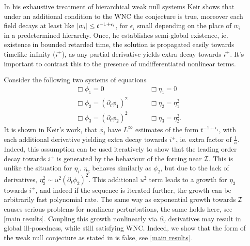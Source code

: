\documentclass[11pt, oneside]{amsart}
\begin{document}
	In his exhaustive treatment of hierarchical weak null systems Keir shows that under an additional condition to the WNC the conjecture is true, moreover each field decays at least like $\left\lvert w_i\right\rvert\leq t^{-1+\epsilon_i}$, for $\epsilon_i$ small depending on the place of $w_i$ in a predetermined hierarchy. Once, he establishes semi-global existence, ie. existence in bounded retarded time, the solution is propagated easily towards timelike infinity ($i^+$), as any partial derivative yields extra decay towards $i^+$. It's important to contrast this to the presence of undifferentiated nonlinear terms.
	
	Consider the following two systems of equations
	\begin{equation*}
		\begin{aligned}
			&\Box\phi_1=0&&&&\Box\eta_1=0\\
			&\Box\phi_2=(\partial_t\phi_1)^2&&&&\Box\eta_2=\eta_1^2\\
			&\Box\phi_3=(\partial_t\phi_2)^2&&&&\Box\eta_3=\eta_2^2.
		\end{aligned}
	\end{equation*}
	It is shown in Keir's work, that $\phi_i$ have $L^\infty$ estimates of the form $t^{-1+\epsilon_i}$, with each additional derivative yielding extra decay towards $i^+$, ie. extra factor of $\frac{1}{u}$. Indeed, this assumption can be used iteratively to show that the leading order decay towards $i^+$ is generated by the behaviour of the forcing near $\mathcal{I}$. This is unlike the situation for $\eta_i$. $\eta_2$ behaves similarly as $\phi_2$, but due to the lack of derivatives, $\eta_2^2\sim u^2 (\partial_t\phi_2)^2$. This additional $u^2$ term leads to a growth for $\eta_3$ towards $i^+$, and indeed if the sequence is iterated further, the growth can be arbitrarily fast polynomial rate. The same way as exponential growth towards $\mathcal{I}$ causes serious problems for nonlinear perturbations, the same holds here, see \cref{main results}. Coupling this growth nonlinearly via $\partial_v$ derivatives may result in global ill-posedness, while still satisfying WNC. Indeed, we show that the form of the weak null conjecture as stated in \cite{deng_global_2018} is false, see \cref{main results}.
	
		
\end{document}
